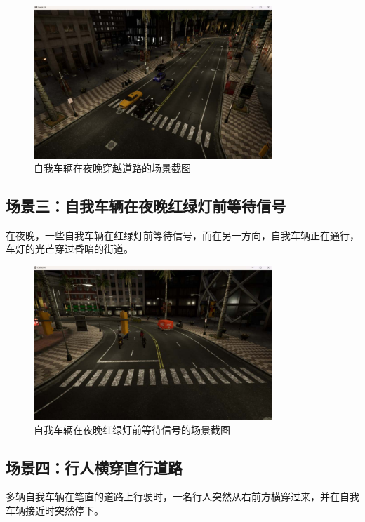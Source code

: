 \begin{figure}[H]
	\centering
	\includegraphics[width=0.8\textwidth]{"images/2.pdf"}
	\caption{自我车辆在夜晚穿越道路的场景截图}
	\label{fig:night_self_driving_cross}
\end{figure}

\subsection{场景三：自我车辆在夜晚红绿灯前等待信号}
\indent 在夜晚，一些自我车辆在红绿灯前等待信号，而在另一方向，自我车辆正在通行，车灯的光芒穿过昏暗的街道。\\

\begin{figure}[H]
	\centering
	\includegraphics[width=0.8\textwidth]{"images/4.pdf"}
	\caption{自我车辆在夜晚红绿灯前等待信号的场景截图}
	\label{fig:night_redlight_cross}
\end{figure}

\subsection{场景四：行人横穿直行道路}
\indent 多辆自我车辆在笔直的道路上行驶时，一名行人突然从右前方横穿过来，并在自我车辆接近时突然停下。\\

